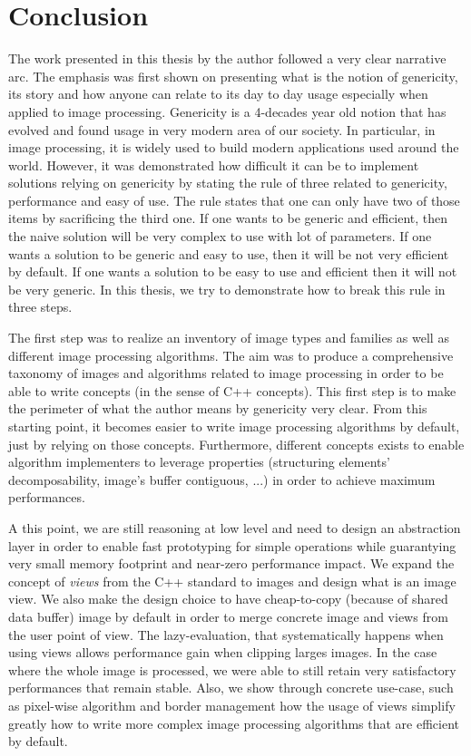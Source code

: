 \chapter{Conclusion}
\label{chap:conclusion}

The work presented in this thesis by the author followed a very clear narrative arc. The emphasis was first shown on
presenting what is the notion of genericity, its story and how anyone can relate to its day to day usage especially when
applied to image processing. Genericity is a 4-decades year old notion that has evolved and found usage in very modern
area of our society. In particular, in image processing, it is widely used to build modern applications used around the
world. However, it was demonstrated how difficult it can be to implement solutions relying on genericity by stating the
rule of three related to genericity, performance and easy of use. The rule states that one can only have two of those
items by sacrificing the third one. If one wants to be generic and efficient, then the naive solution will be very
complex to use with lot of parameters. If one wants a solution to be generic and easy to use, then it will be not very
efficient by default. If one wants a solution to be easy to use and efficient then it will not be very generic.
In this thesis, we try to demonstrate how to break this rule in three steps.

The first step was to realize an inventory of image types and families as well as different image processing algorithms.
The aim was to produce a comprehensive taxonomy of images and algorithms related to image processing in order to be able
to write concepts (in the sense of C++ concepts). This first step is to make the perimeter of what the author means by
genericity very clear. From this starting point, it becomes easier to write image processing algorithms by default, just
by relying on those concepts. Furthermore, different concepts exists to enable algorithm implementers to leverage
properties (structuring elements' decomposability, image's buffer contiguous, ...) in order to achieve maximum
performances.

A this point, we are still reasoning at low level and need to design an abstraction layer in order to enable fast
prototyping for simple operations while guarantying very small memory footprint and near-zero performance impact. We
expand the concept of \emph{views} from the C++ standard to images and design what is an image view. We also make the
design choice to have cheap-to-copy (because of shared data buffer) image by default in order to merge concrete image
and views from the user point of view. The lazy-evaluation, that systematically happens when using views allows
performance gain when clipping larges images. In the case where the whole image is processed, we were able to still
retain very satisfactory performances that remain stable. Also, we show through concrete use-case, such as pixel-wise
algorithm and border management how the usage of views simplify greatly how to write more complex image processing
algorithms that are efficient by default.

